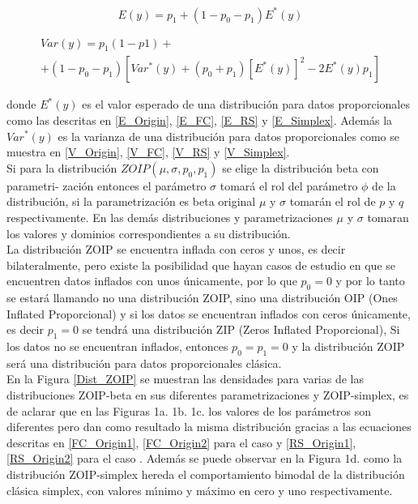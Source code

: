 \begin{equation}
	E(y) = p_1+(1-p_0-p_1)E^*(y)
\end{equation}

\begin{multline}
	Var(y) = p_1(1-p1)+\\
	+(1-p_0-p_1)\left[Var^*(y)+(p_0+p_1)[E^*(y)]^2-2E^*(y)p_1\right]
\end{multline}


donde $E^*(y)$ es el valor esperado de una distribuci\'{o}n para datos proporcionales como las descritas en \eqref{E_Origin}, \eqref{E_FC}, \eqref{E_RS} y \eqref{E_Simplex}. Adem\'{a}s la $Var^*(y)$ es la varianza de una distribuci\'{o}n para datos proporcionales como se muestra en  \eqref{V_Origin}, \eqref{V_FC}, \eqref{V_RS} y \eqref{V_Simplex}.\\

Si para la distribuci\'{o}n $ZOIP(\mu, \sigma, p_0, p_1)$ se elige la distribuci\'{o}n beta con parametri- zaci\'{o}n \cite{Ferrari2} entonces el par\'{a}metro $\sigma$ tomar\'{a} el rol del par\'{a}metro $\phi$ de la distribuci\'{o}n, si la parametrizaci\'{o}n es beta original $\mu$ y $\sigma$ tomar\'{a}n el rol de $p$ y $q$ respectivamente. En las dem\'{a}s distribuciones y parametrizaciones $\mu$ y $\sigma$ tomaran los valores y dominios correspondientes a su distribuci\'{o}n.\\

La distribuci\'{o}n ZOIP se encuentra inflada con ceros y unos, es decir bilateralmente, pero existe la posibilidad que hayan casos de estudio en que se encuentren datos inflados con unos \'{u}nicamente, por lo que $p_0=0$ y por lo tanto se estar\'{a} llamando no una distribuci\'{o}n ZOIP, sino una distribuci\'{o}n OIP (Ones Inflated Proporcional) y si los datos se encuentran inflados con ceros \'{u}nicamente, es decir $p_1=0$ se tendr\'{a} una distribuci\'{o}n ZIP (Zeros Inflated Proporcional), Si los datos no se encuentran inflados, entonces $p_0=p_1=0$ y la distribuci\'{o}n ZOIP ser\'{a} una distribuci\'{o}n para datos proporcionales cl\'{a}sica.\\

En la Figura \ref{Dist_ZOIP} se muestran las densidades para varias de las distribuciones ZOIP-beta en sus diferentes parametrizaciones y ZOIP-simplex, es de aclarar que en las Figuras 1a. 1b. 1c. los valores de los par\'{a}metros son diferentes pero dan como resultado la misma distribuci\'{o}n gracias a las ecuaciones descritas en \eqref{FC_Origin1}, \eqref{FC_Origin2} para el caso \cite{Ferrari2} y \eqref{RS_Origin1}, \eqref{RS_Origin2} para el caso \cite{Stasinopoulos2}. Adem\'{a}s se puede observar en la Figura 1d. como la distribuci\'{o}n ZOIP-simplex hereda el comportamiento  bimodal de la distribuci\'{o}n cl\'{a}sica simplex, con valores m\'{\i}nimo y m\'{a}ximo en cero y uno respectivamente. 

